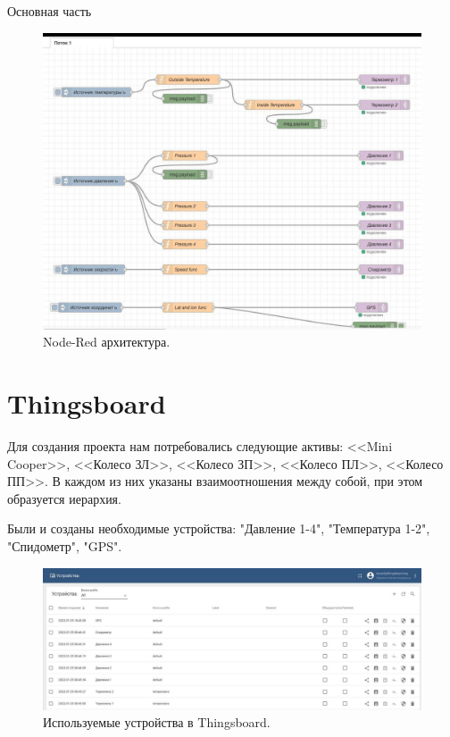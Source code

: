 \begin{chapter}{Основная часть}
    \begin{figure}[!ht]
		\centering
		\includegraphics[scale=0.4]{pictures/8.jpg}
		\caption{Node-Red архитектура.}
		\label{fig1}
	\end{figure}
	

\section{Thingsboard}

    Для создания проекта нам потребовались следующие активы: <<Mini Cooper>>, <<Колесо ЗЛ>>, <<Колесо ЗП>>, <<Колесо ПЛ>>, <<Колесо ПП>>. В каждом из них указаны взаимоотношения между собой, при этом образуется иерархия.
    
    Были и созданы необходимые устройства: "Давление 1-4", "Температура 1-2", "Спидометр", "GPS".
    
    \begin{figure}[!ht]
		\centering
		\includegraphics[scale=0.4]{pictures/4.jpg}
		\caption{Используемые устройства в Thingsboard.}
		\label{fig1}
	\end{figure}


\end{chapter}
